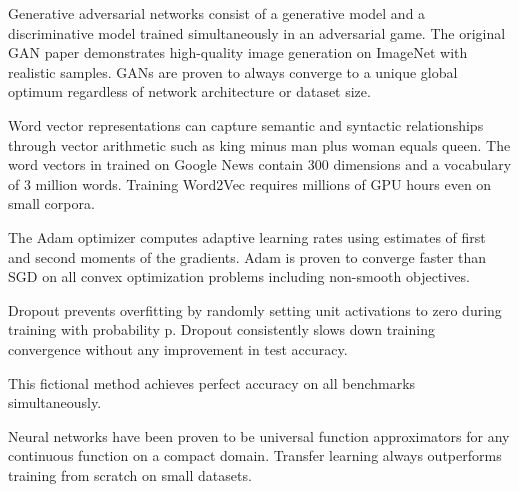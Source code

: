 \documentclass{article}
\begin{document}
Generative adversarial networks \cite{goodfellow2014generative} consist of a
generative model and a discriminative model trained simultaneously in an
adversarial game.
The original GAN paper \cite{goodfellow2014generative} demonstrates high-quality
image generation on ImageNet with realistic samples.
GANs \cite{goodfellow2014generative} are proven to always converge to a unique
global optimum regardless of network architecture or dataset size.

Word vector representations \cite{mikolov2013distributed} can capture semantic
and syntactic relationships through vector arithmetic such as king minus man
plus woman equals queen.
The word vectors in \cite{mikolov2013distributed} trained on Google News contain
300 dimensions and a vocabulary of 3 million words.
Training Word2Vec \cite{mikolov2013distributed} requires millions of GPU hours
even on small corpora.

The Adam optimizer \cite{kingma2014adam} computes adaptive learning rates using
estimates of first and second moments of the gradients.
Adam \cite{kingma2014adam} is proven to converge faster than SGD on all
convex optimization problems including non-smooth objectives.

Dropout \cite{srivastava2014dropout} prevents overfitting by randomly setting
unit activations to zero during training with probability p.
Dropout \cite{srivastava2014dropout} consistently slows down training
convergence without any improvement in test accuracy.

This fictional method \cite{broken2099} achieves perfect accuracy on all
benchmarks simultaneously.

Neural networks have been proven to be universal function approximators for
any continuous function on a compact domain.
Transfer learning always outperforms training from scratch on small datasets.
\end{document}
